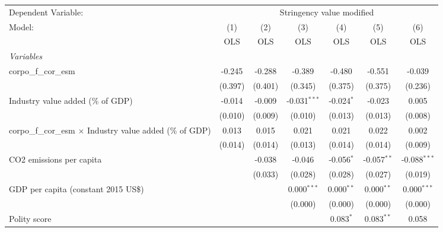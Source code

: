 
\begingroup
\centering
\begin{tabular}{lcccccc}
   \toprule
   Dependent Variable: & \multicolumn{6}{c}{Stringency value modified}\\
   Model:                                                            & (1)     & (2)     & (3)            & (4)          & (5)           & (6)\\  
                                                                     &  OLS    & OLS     & OLS            & OLS          & OLS           & OLS\\  
   \midrule
   \emph{Variables}\\
   corpo\_f\_cor\_esm                                                & -0.245  & -0.288  & -0.389         & -0.480       & -0.551        & -0.039\\   
                                                                     & (0.397) & (0.401) & (0.345)        & (0.375)      & (0.375)       & (0.236)\\   
   Industry value added (\% of GDP)                                  & -0.014  & -0.009  & -0.031$^{***}$ & -0.024$^{*}$ & -0.023        & 0.005\\   
                                                                     & (0.010) & (0.009) & (0.010)        & (0.013)      & (0.013)       & (0.008)\\   
   corpo\_f\_cor\_esm $\times$ Industry value added (\% of GDP)      & 0.013   & 0.015   & 0.021          & 0.021        & 0.022         & 0.002\\   
                                                                     & (0.014) & (0.014) & (0.013)        & (0.014)      & (0.014)       & (0.009)\\   
   CO2 emissions per capita                                          &         & -0.038  & -0.046         & -0.056$^{*}$ & -0.057$^{**}$ & -0.088$^{***}$\\   
                                                                     &         & (0.033) & (0.028)        & (0.028)      & (0.027)       & (0.019)\\   
   GDP per capita (constant 2015 US\$)                               &         &         & 0.000$^{***}$  & 0.000$^{**}$ & 0.000$^{**}$  & 0.000$^{***}$\\   
                                                                     &         &         & (0.000)        & (0.000)      & (0.000)       & (0.000)\\   
   Polity score                                                      &         &         &                & 0.083$^{*}$  & 0.083$^{**}$  & 0.058\\   

\end{tabular}
